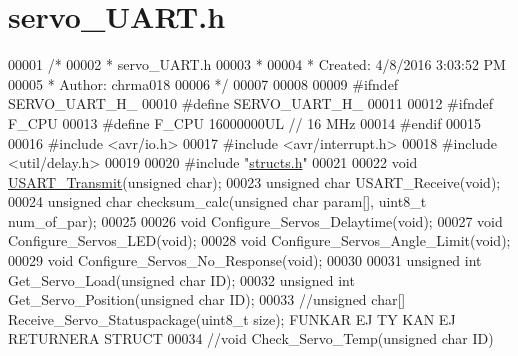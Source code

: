 \hypertarget{servo___u_a_r_t_8h_source}{}\section{servo\+\_\+\+U\+A\+R\+T.\+h}
\label{servo___u_a_r_t_8h_source}

\begin{DoxyCode}
00001 \textcolor{comment}{/*}
00002 \textcolor{comment}{ * servo\_UART.h}
00003 \textcolor{comment}{ *}
00004 \textcolor{comment}{ * Created: 4/8/2016 3:03:52 PM}
00005 \textcolor{comment}{ *  Author: chrma018}
00006 \textcolor{comment}{ */} 
00007 
00008 
00009 \textcolor{preprocessor}{#ifndef SERVO\_UART\_H\_}
00010 \textcolor{preprocessor}{#define SERVO\_UART\_H\_}
00011 
00012 \textcolor{preprocessor}{#ifndef F\_CPU}
00013 \textcolor{preprocessor}{#define F\_CPU 16000000UL        // 16 MHz}
00014 \textcolor{preprocessor}{#endif}
00015 
00016 \textcolor{preprocessor}{#include <avr/io.h>}
00017 \textcolor{preprocessor}{#include <avr/interrupt.h>}
00018 \textcolor{preprocessor}{#include <util/delay.h>}
00019 
00020 \textcolor{preprocessor}{#include "\hyperlink{structs_8h}{structs.h}"}
00021 
00022 \textcolor{keywordtype}{void} \hyperlink{_u_s_a_r_t_8h_ab8c416106cf1aff4ccdb3da4860fc179}{USART\_Transmit}(\textcolor{keywordtype}{unsigned} \textcolor{keywordtype}{char});
00023 \textcolor{keywordtype}{unsigned} \textcolor{keywordtype}{char} USART\_Receive(\textcolor{keywordtype}{void});
00024 \textcolor{keywordtype}{unsigned} \textcolor{keywordtype}{char} checksum\_calc(\textcolor{keywordtype}{unsigned} \textcolor{keywordtype}{char} param[], uint8\_t num\_of\_par);
00025 
00026 \textcolor{keywordtype}{void} Configure\_Servos\_Delaytime(\textcolor{keywordtype}{void});
00027 \textcolor{keywordtype}{void} Configure\_Servos\_LED(\textcolor{keywordtype}{void});
00028 \textcolor{keywordtype}{void} Configure\_Servos\_Angle\_Limit(\textcolor{keywordtype}{void});
00029 \textcolor{keywordtype}{void} Configure\_Servos\_No\_Response(\textcolor{keywordtype}{void});
00030 
00031 \textcolor{keywordtype}{unsigned} \textcolor{keywordtype}{int} Get\_Servo\_Load(\textcolor{keywordtype}{unsigned} \textcolor{keywordtype}{char} ID);
00032 \textcolor{keywordtype}{unsigned} \textcolor{keywordtype}{int} Get\_Servo\_Position(\textcolor{keywordtype}{unsigned} \textcolor{keywordtype}{char} ID);
00033 \textcolor{comment}{//unsigned char[] Receive\_Servo\_Statuspackage(uint8\_t size); FUNKAR EJ TY KAN EJ RETURNERA STRUCT}
00034 \textcolor{comment}{//void Check\_Servo\_Temp(unsigned char ID)}

\end{DoxyCode}
